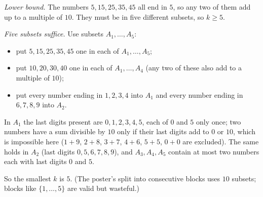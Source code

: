 \emph{Lower bound.} The numbers $5,15,25,35,45$ all end in $5$, so any two of them add up to a multiple of $10$. They must be in five different subsets, so $k\ge5$.

\emph{Five subsets suffice.} Use subsets $A_1,\dots,A_5$:
\begin{itemize}
\item put $5,15,25,35,45$ one in each of $A_1,\dots,A_5$;
\item put $10,20,30,40$ one in each of $A_1,\dots,A_4$ (any two of these also add to a multiple of $10$);
\item put every number ending in $1,2,3,4$ into $A_1$ and every number ending in $6,7,8,9$ into $A_2$.
\end{itemize}
In $A_1$ the last digits present are $0,1,2,3,4,5$, each of $0$ and $5$ only once; two numbers have a sum divisible by $10$ only if their last digits add to $0$ or $10$, which is impossible here ($1+9$, $2+8$, $3+7$, $4+6$, $5+5$, $0+0$ are excluded). The same holds in $A_2$ (last digits $0,5,6,7,8,9$), and $A_3,A_4,A_5$ contain at most two numbers each with last digits $0$ and $5$.

So the smallest $k$ is $\boxed{5}$. (The poster's split into consecutive blocks uses $10$ subsets; blocks like $\{1,\dots,5\}$ are valid but wasteful.)
